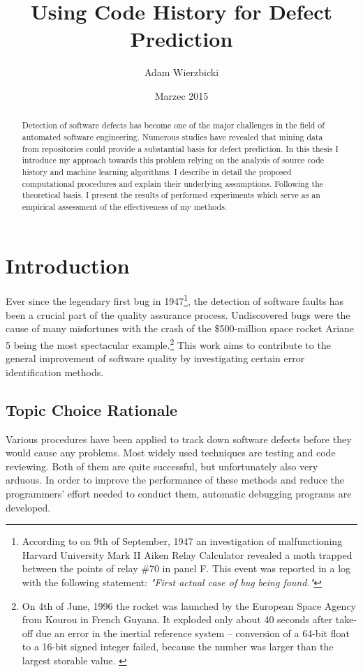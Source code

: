 \documentclass{pracamgr}
\author{Adam Wierzbicki}
\title{Using Code History for Defect Prediction}
\date{Marzec 2015}
\begin{document}
\maketitle

\begin{abstract}
Detection of software defects has become one of the major challenges in the field of automated software engineering. Numerous studies have revealed that mining data from repositories could provide a substantial basis for defect prediction. In this thesis I introduce my approach towards this problem relying on the analysis of source code history and machine learning algorithms. I describe in detail the proposed computational procedures and explain their underlying assumptions. Following the theoretical basis, I  present the results of performed experiments which serve as an empirical assessment of the effectiveness of my methods.
\end{abstract}

\tableofcontents

\chapter{Introduction}
Ever since the legendary first bug in 1947\footnote{According to \cite{first_bug} on 9th of September, 1947 an investigation of malfunctioning Harvard University Mark II Aiken Relay Calculator revealed a moth trapped between the points of relay \#70 in panel F. This event was reported in a log with the following statement: \textit{"First actual case of bug being found."}}, the detection of software faults has been a crucial part of the quality assurance process. Undiscovered bugs were the cause of many misfortunes with the crash of the \$500-million space rocket Ariane 5 being the most spectacular example.\footnote{On 4th of June, 1996 the rocket was launched by the European Space Agency from Kourou in French Guyana. It exploded only about 40 seconds after take-off due an error in the inertial reference system -- conversion of a 64-bit float to a 16-bit signed integer failed, because the number was larger than the largest storable value. \cite{ariane}} This work aims to contribute to the general improvement of software quality by investigating certain error identification methods.

\section{Topic Choice Rationale}
Various procedures have been applied to track down software defects before they would cause any problems. Most widely used techniques are testing and code reviewing. Both of them are quite successful, but unfortunately also very arduous. In order to improve the performance of these methods and reduce the programmers' effort needed to conduct them, automatic debugging programs are developed.
\end{document}
